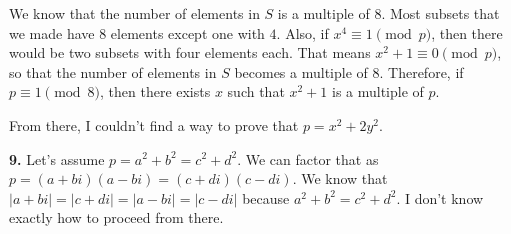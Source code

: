 \documentclass{article}
\begin{document}
We know that the number of elements in $S$ is a multiple of $8$. Most subsets that we made have $8$ elements except one with $4$. Also, if $x^4 \equiv 1 \pmod{p}$, then there would be two subsets with four elements each. That means $x^2 + 1 \equiv 0 \pmod{p}$, so that the number of elements in $S$ becomes a multiple of $8$. Therefore, if $p \equiv 1 \pmod{8}$, then there exists $x$ such that $x^2 + 1$ is a multiple of $p$.
\newline

From there, I couldn't find a way to prove that $p = x^2 + 2y^2$.
\newline

\textbf{9.} Let's assume $p = a^2 + b^2 = c^2 + d^2$. We can factor that as $p = (a + bi)(a - bi) = (c + di)(c - di)$. We know that $|a + bi| = |c + di| = |a - bi| = |c - di|$ because $a^2 + b^2 = c^2 + d^2$. I don't know exactly how to proceed from there.
\end{document}
